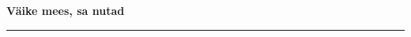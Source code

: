\documentclass[10pt]{book}
\begin{document}
{
  \samepage
  \raggedbottom
  \raggedright
  \sloppy


  \vspace{0.2in}

  \noindent\begin{minipage}{.1\textwidth}
    \hfill\vspace{0.1in}
  \end{minipage}%
  \noindent\begin{minipage}{.8\textwidth}
    \centering
    \bfseries
    \large V\"aike mees, sa nutad
  \end{minipage}%
  \noindent\begin{minipage}{.1\textwidth}
      \hfill\vspace{0.1in}
  \end{minipage}

  \nopagebreak[4]
  \vspace{0.1in}
  \nopagebreak[4]
  \hrule height 0.05ex
  \nopagebreak[4]
  \vspace{-0.05in}




}
\end{document}
